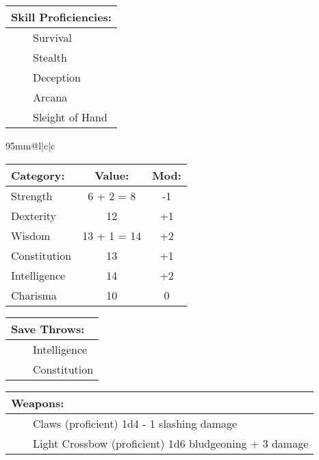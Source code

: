 \documentclass[11pt]{article}
\newcommand{\tabitem}{~~\llap{--}~~}
\begin{document}
\begin{multicols}{2}
\vspace{2mm}

\noindent \begin{tabularx}{95mm}{@{}l}
{\Large \textbf{Skill Proficiencies:}} \\
\hline
\tabitem Survival \\
\tabitem Stealth \\
\tabitem Deception \\
\tabitem Arcana \\
\tabitem Sleight of Hand
		\end{tabularx}

\vspace{4mm}

\noindent \begin{tabularx}{95mm}{@{}l|c|c}
 \\
\hline
		\end{tabularx}
\noindent \begin{tabular}{@{}l|c|c}
\textbf{Category:} 			& \textbf{Value:} 	& \textbf{Mod:} \\
\hline
Strength 					& 6 + 2 = 8 		& -1		\\
Dexterity 					& 12				& +1		\\
Wisdom 						& 13 + 1 = 14		& +2		\\
Constitution 				& 13 				& +1		\\
Intelligence 				& 14 				& +2		\\
Charisma 					& 10 				& 0
		\end{tabular}

\vspace{4mm}

\noindent \begin{tabularx}{95mm}{@{}l}
{\Large \textbf{Save Throws:}} \\
\hline
\tabitem Intelligence \\
\tabitem Constitution \\
		\end{tabularx}

\vspace{4mm}

\noindent \begin{tabularx}{95mm}{@{}l}
{\Large \textbf{Weapons:}} \\
\hline
\tabitem Claws (proficient) 1d4 - 1 slashing damage \\
\tabitem Light Crossbow (proficient) 1d6 bludgeoning + 3 damage
		\end{tabularx}


\end{multicols}
\end{document}
